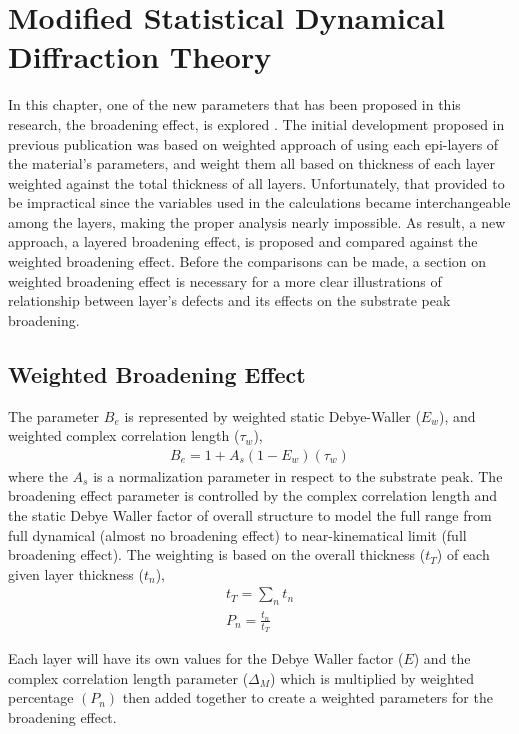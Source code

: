 \chapter{Modified Statistical Dynamical Diffraction Theory}

In this chapter, one of the new parameters that has been proposed in this research, the broadening effect, is explored .  The initial development proposed in previous publication \cite{Shreeman1} was based on weighted approach of using each epi-layers of the material's parameters, and weight them all based on thickness of each layer weighted against the total thickness of all layers.  Unfortunately, that provided to be impractical since the variables used in the calculations became interchangeable among the layers, making the proper analysis nearly impossible.  As result, a new approach, a layered broadening effect, is proposed and compared against the weighted broadening effect.  Before the comparisons can be made, a section on weighted broadening effect is necessary for a more clear illustrations of relationship between layer's defects and its effects on the substrate peak broadening.



\section{Weighted Broadening Effect}


The parameter $B_e$ is represented by weighted static Debye-Waller ($E_w$), and weighted complex correlation length ($\tau_w$),
\begin{align}
B_e =1+A_s (1-E_w)(\tau_w) \label{oldB}
\end{align}
where the $A_s$ is a normalization parameter in respect to the substrate peak. The broadening effect parameter is controlled by the complex correlation length and the static Debye Waller factor of overall structure to model the full range from full dynamical (almost no broadening effect) to near-kinematical limit (full broadening effect).  The weighting is based on the overall thickness ($t_T$) of each given layer thickness ($t_n$),
\begin{align}
t_T = \sum_n{t_n}\\
P_n =\frac{t_n}{t_T}
\end{align}

Each layer will have its own values for the Debye Waller factor ($E$) and the complex correlation length parameter ($\Delta_M$) which is multiplied by weighted percentage $(P_n)$ then added together to create a weighted parameters for the broadening effect.



